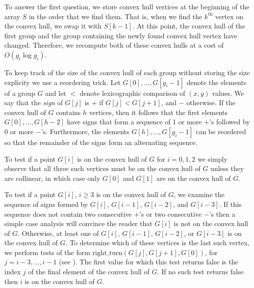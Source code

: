 \documentclass{elsart}
\newcommand{\rt}{\mathrm{right\_turn}}
\begin{document}
To answer the first question, we store convex hull vertices at the
beginning of the array $S$ in the order that we find them.  That is,
when we find the $k^\mathrm{th}$ vertex on the convex hull, we swap it
with $S[k-1]$.  At this point, the convex hull of the first group and
the group containing the newly found convex hull vertex have changed.
Therefore, we recompute both of these convex hulls at a cost of
$O(g_i\log g_i)$.


To keep track of the size of the convex hull of each group without
storing the size explicity we use a reordering trick.  Let
$G[0],\ldots,G[g_i-1]$ denote the elements of a group $G$ and let $<$
denote lexicographic comparison of $(x,y)$ values.  We say that the
\emph{sign} of $G[j]$ is $+$ if $G[j]<G[j+1]$, and $-$ otherwise. If
the convex hull of $G$ contains $h$ vertices, then it follows that the
first elements $G[0],\ldots,G[h-2]$ have signs that form a sequence of
1 or more $+$'s followed by 0 or more $-$'s.  Furthermore, the
elements $G[h],\ldots,G[g_i-1]$ can be reordered so that the remainder
of the signs form an alternating sequence.  

To test if a point $G[i]$ is on the convex hull of $G$ for $i=0,1,2$
we simply observe that all three such vertices must be on the convex
hull of $G$ unless they are collinear, in which case only $G[0]$ and
$G[1]$ are on the convex hull of $G$.

To test if a point $G[i]$, $i\ge 3$ is on the convex hull of $G$, we
examine the sequence of signs formed by $G[i]$, $G[i-1]$, $G[i-2]$,
and $G[i-3]$.  If this sequence does not contain two consecutive $+$'s
or two consecutive $-$'s then a simple case analysis will convince the
reader that $G[i]$ is not on the convex hull of $G$.  Otherwise, at
least one of $G[i]$, $G[i-1]$, $G[i-2]$, or $G[i-3]$ is on the convex
hull of $G$. To determine which of these vertices is the last such
vertex, we perform tests of the form $\rt(G[j],G[j+1],G[0])$, for
$j=i-3,\ldots, i-1$ (see ).  The first value for
which this test returns false is the index $j$ of the final element of
the convex hull of $G$.  If no such test returns false then $i$ is on
the convex hull of $G$.
\end{document}
